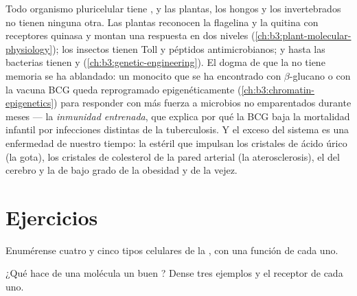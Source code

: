 \begin{remark}\label{rem:b3:innate-immunity:everywhere}
Todo organismo pluricelular tiene , y las plantas, los
hongos y los invertebrados no tienen ninguna otra. Las plantas reconocen
la flagelina y la quitina con receptores quinasa y montan una respuesta
en dos niveles (\cref{ch:b3:plant-molecular-physiology}); los insectos
tienen Toll y péptidos antimicrobianos; y hasta las bacterias tienen
 y  (\cref{ch:b3:genetic-engineering}). El
dogma de que la  no tiene memoria se ha ablandado: un
monocito que se ha encontrado con $\beta$-glucano o con la vacuna BCG
queda reprogramado epigenéticamente
(\cref{ch:b3:chromatin-epigenetics}) para responder con más fuerza a
microbios no emparentados durante meses --- la \emph{inmunidad
entrenada}, que explica por qué la BCG baja la mortalidad infantil por
infecciones distintas de la tuberculosis. Y el exceso del sistema es una
enfermedad de nuestro tiempo: la  estéril que impulsan los
cristales de ácido úrico (la gota), los cristales de colesterol de la
pared arterial (la aterosclerosis), el  del cerebro y la
 de bajo grado de la obesidad y de la vejez.
\end{remark}

\section{Ejercicios}

\begin{exercise}[$\star$]\label{exo:b3:innate-immunity:1}
Enumérense cuatro  y cinco tipos celulares de la , con una función de cada uno.
\end{exercise}

\begin{exercise}[$\star$]\label{exo:b3:innate-immunity:2}
¿Qué hace de una molécula un buen ?
Dense tres ejemplos y el receptor de cada uno.
\end{exercise}

